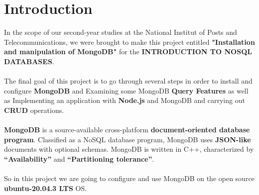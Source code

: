 \chapter*{Introduction}
\begin{spacing}{1.5}
\Large In the scope of our second-year studies at the National Institut of Posts and Telecommunications, we were brought to make this project entitled \textbf{"Installation and manipulation of MongoDB"} for the \textbf{INTRODUCTION TO NOSQL DATABASES}.
\\\\
The final goal of this project is to go through several steps in order to install and configure  \textbf{MongoDB} and Examining some MongoDB \textbf{Query Features} as well as Implementing an application with \textbf{Node.js} and MongoDB and carrying out \textbf{CRUD} operations.
\\\\
\textbf{MongoDB} is a source-available cross-platform \textbf{document-oriented database program}. Classified as a NoSQL database program, MongoDB uses  \textbf{JSON-like} documents with optional schemas. MongoDB is written in C++, characterized by \textbf{“Availability”} and \textbf{“Partitioning tolerance”}.
\\\\
So in this project we are going to configure and use MongoDB on the open source \textbf{ubuntu-20.04.3 LTS} OS. \\ 


\end{spacing}

\makeatletter
\renewcommand{\thesection}{\@arabic\c@section}
\makeatother
